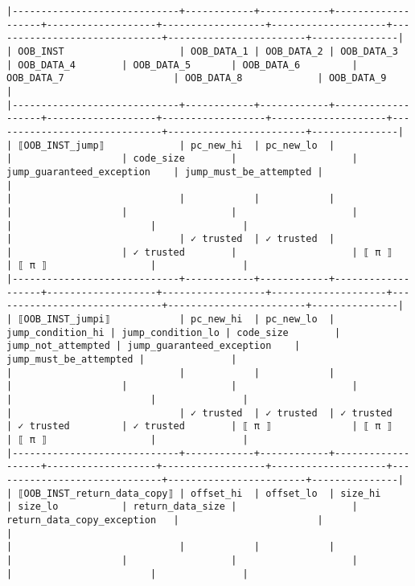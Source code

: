 \documentclass[varwidth=\maxdimen,margin=0.5cm,multi={verbatim}]{standalone}
\begin{document}
\begin{verbatim}
|-----------------------------+------------+------------+-------------------+-------------------+------------------+--------------------+------------------------------+------------------------+---------------|
| OOB_INST                    | OOB_DATA_1 | OOB_DATA_2 | OOB_DATA_3        | OOB_DATA_4        | OOB_DATA_5       | OOB_DATA_6         | OOB_DATA_7                   | OOB_DATA_8             | OOB_DATA_9    |
|-----------------------------+------------+------------+-------------------+-------------------+------------------+--------------------+------------------------------+------------------------+---------------|
| ⟦OOB_INST_jump⟧             | pc_new_hi  | pc_new_lo  |                   |                   | code_size        |                    | jump_guaranteed_exception    | jump_must_be_attempted |               |
|                             |            |            |                   |                   |                  |                    |                              |                        |               |
|                             | ✓ trusted  | ✓ trusted  |                   |                   | ✓ trusted        |                    | ⟦ π ⟧                        | ⟦ π ⟧                  |               |
|-----------------------------+------------+------------+-------------------+-------------------+------------------+--------------------+------------------------------+------------------------+---------------|
| ⟦OOB_INST_jumpi⟧            | pc_new_hi  | pc_new_lo  | jump_condition_hi | jump_condition_lo | code_size        | jump_not_attempted | jump_guaranteed_exception    | jump_must_be_attempted |               |
|                             |            |            |                   |                   |                  |                    |                              |                        |               |
|                             | ✓ trusted  | ✓ trusted  | ✓ trusted         | ✓ trusted         | ✓ trusted        | ⟦ π ⟧              | ⟦ π ⟧                        | ⟦ π ⟧                  |               |
|-----------------------------+------------+------------+-------------------+-------------------+------------------+--------------------+------------------------------+------------------------+---------------|
| ⟦OOB_INST_return_data_copy⟧ | offset_hi  | offset_lo  | size_hi           | size_lo           | return_data_size |                    | return_data_copy_exception   |                        |               |
|                             |            |            |                   |                   |                  |                    |                              |                        |               |

\end{verbatim}
\end{document}
